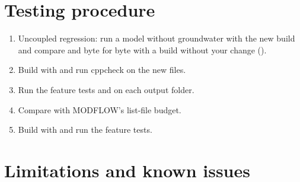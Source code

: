 \section{Testing procedure}
\begin{enumerate}
\item Uncoupled regression: run a model without groundwater with the new build and compare  and
 byte for byte with a build without your change ().
\item Build with  and run cppcheck on the new files.
\item Run the feature tests and  on each output folder.
\item Compare with MODFLOW's list-file budget.
\item Build with  and run the feature tests.
\end{enumerate}

\section{Limitations and known issues}\label{ch:limits}
